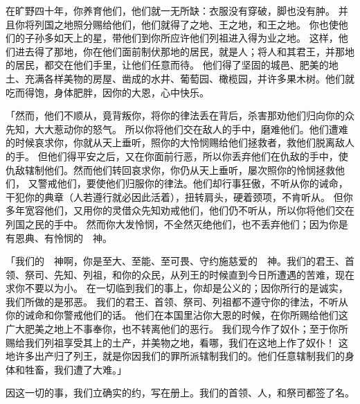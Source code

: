 {在旷野四十年，你养育他们，他们就一无所缺：衣服没有穿破，脚也没有肿。
并且你将列国之地照分赐给他们，他们就得了{}之地、{}王之地，和{}王{}之地。
你也使他们的子孙多如天上的星，带他们到你所应许他们列祖进入得为业之地。
这样，他们进去得了那地，你在他们面前制伏那地的居民，就是{}人；将{}人和其君王，并那地的居民，都交在他们手里，让他们任意而待。
他们得了坚固的城邑、肥美的地土、充满各样美物的房屋、凿成的水井、葡萄园、橄榄园，并许多果木树。他们就吃而得饱，身体肥胖，因你的大恩，心中快乐。
\par }{\PP {}「然而，他们不顺从，竟背叛你，将你的律法丢在背后，杀害那劝他们归向你的众先知，大大惹动你的怒气。
所以你将他们交在敌人的手中，磨难他们。他们遭难的时候哀求你，你就从天上垂听，照你的大怜悯赐给他们拯救者，救他们脱离敌人的手。
但他们得平安之后，又在你面前行恶，所以你丢弃他们在仇敌的手中，使仇敌辖制他们。然而他们转回哀求你，你仍从天上垂听，屡次照你的怜悯拯救他们，
又警戒他们，要使他们归服你的律法。他们却行事狂傲，不听从你的诫命，干犯你的典章（人若遵行就必因此活着），扭转肩头，硬着颈项，不肯听从。
但你多年宽容他们，又用你的灵借众先知劝戒他们，他们仍不听从，所以你将他们交在列国之民的手中。
然而你大发怜悯，不全然灭绝他们，也不丢弃他们；因为你是有恩典、有怜悯的　神。
\par }{\PP {}「我们的　神啊，你是至大、至能、至可畏、守约施慈爱的　神。我们的君王、首领、祭司、先知、列祖，和你的众民，从{}列王的时候直到今日所遭遇的苦难，现在求你不要以为小。
在一切临到我们的事上，你却是公义的；因你所行的是诚实，我们所做的是邪恶。
我们的君王、首领、祭司、列祖都不遵守你的律法，不听从你的诫命和你警戒他们的话。
他们在本国里沾你大恩的时候，在你所赐给他们这广大肥美之地上不事奉你，也不转离他们的恶行。
我们现今作了奴仆；至于你所赐给我们列祖享受其上的土产，并美物之地，看哪，我们在这地上作了奴仆！
这地许多出产归了列王，就是你因我们的罪所派辖制我们的。他们任意辖制我们的身体和牲畜，我们遭了大难。」
\par }{\PP {}因这一切的事，我们立确实的约，写在册上。我们的首领、{}人，和祭司都签了名。

}
